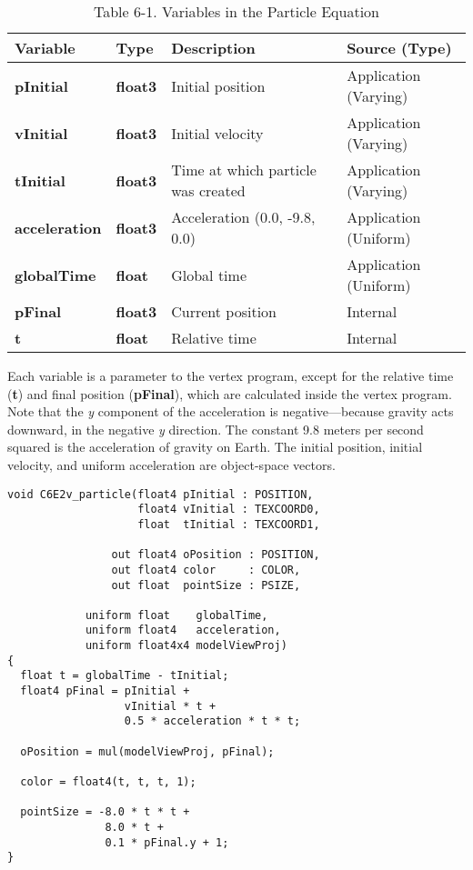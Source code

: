 \documentclass[../main.tex]{subfiles}
\begin{document}
\begin{table}
\centering
\begin{tabular}{ p{2cm} p{1cm} p{6cm} p{3.5cm}  } 

Variable & Type & Description & Source (Type) \\
\hline

\textbf{pInitial} & \textbf{float3} & Initial position & Application (Varying) \\
\hline
\textbf{vInitial} & \textbf{float3} & Initial velocity & Application (Varying) \\
\hline
\textbf{tInitial} & \textbf{float3} & Time at which particle was created & Application (Varying) \\
\hline
\textbf{acceleration} & \textbf{float3} & Acceleration (0.0, -9.8, 0.0) & Application (Uniform) \\
\hline
\textbf{globalTime} & \textbf{float} & Global time & Application (Uniform) \\
\hline
\textbf{pFinal} & \textbf{float3} & Current position & Internal\\
\hline
\textbf{t} & \textbf{float} & Relative time & Internal \\
\hline

\end{tabular}

\caption{Table 6-1. Variables in the Particle Equation}
\label{table:6-1}
\end{table}

Each variable is a parameter to the vertex program, except for the relative time (\textbf{t}) and final position (\textbf{pFinal}), which are calculated inside the vertex program. Note that the \textit{y} component of the acceleration is negative—because gravity acts downward, in the negative \textit{y} direction. The constant 9.8 meters per second squared is the acceleration of gravity on Earth. The initial position, initial velocity, and uniform acceleration are object-space vectors.

\FloatBarrier
\begin{lstlisting}[caption=Example 6-2. The \textbf{C6E2v_particle} Vertex Program]
void C6E2v_particle(float4 pInitial : POSITION,
                    float4 vInitial : TEXCOORD0,
                    float  tInitial : TEXCOORD1,

                out float4 oPosition : POSITION,
                out float4 color     : COLOR,
                out float  pointSize : PSIZE,

            uniform float    globalTime,
            uniform float4   acceleration,
            uniform float4x4 modelViewProj)
{
  float t = globalTime - tInitial;
  float4 pFinal = pInitial +
                  vInitial * t +
                  0.5 * acceleration * t * t;

  oPosition = mul(modelViewProj, pFinal);

  color = float4(t, t, t, 1);

  pointSize = -8.0 * t * t +
               8.0 * t +
               0.1 * pFinal.y + 1;
}
\end{lstlisting}
\FloatBarrier
\end{document}
